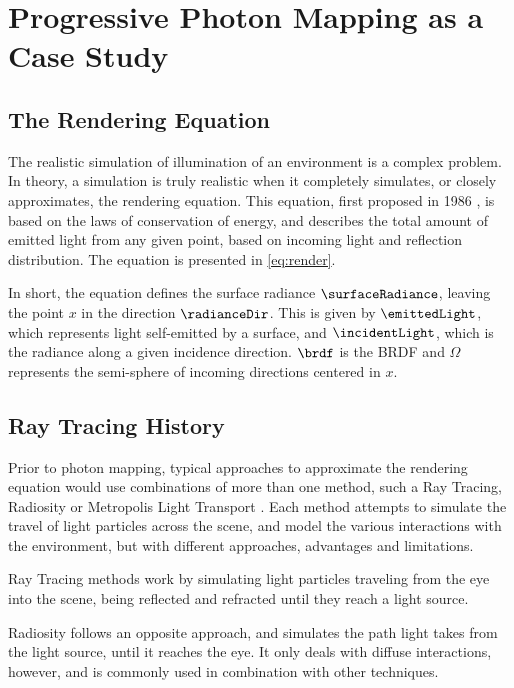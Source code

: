 \documentclass[main.tex]{subfiles}
\begin{document}
\section{Progressive Photon Mapping as a Case Study} \label{section:photon}



\subsection{The Rendering Equation}

The realistic simulation of illumination of an environment is a complex problem. In theory, a simulation is truly realistic when it completely simulates, or closely approximates, the rendering equation. This equation, first proposed in 1986 \cite{kajiya1986rendering}, is based on the laws of conservation of energy, and describes the total amount of emitted light from any given point, based on incoming light and reflection distribution. The equation is presented in \cref{eq:render}.


In short, the equation defines the surface radiance $\surfaceRadiance$, leaving the point $x$ in the direction $\radianceDir$. This is given by $\emittedLight$, which represents light self-emitted by a surface, and $\incidentLight$, which is the radiance along a given incidence direction. $\brdf$ is the \acf{BRDF} and $\Omega$ represents the semi-sphere of incoming directions centered in $x$.


\subsection{Ray Tracing History}

Prior to photon mapping, typical approaches to approximate the rendering equation would use combinations of more than one method, such a Ray Tracing, Radiosity or Metropolis Light Transport \cite{wallace1987two,veach1997metropolis}. Each method attempts to simulate the travel of light particles across the scene, and model the various interactions with the environment, but with different approaches, advantages and limitations.

Ray Tracing methods work by simulating light particles traveling from the eye into the scene, being reflected and refracted until they reach a light source.

Radiosity follows an opposite approach, and simulates the path light takes from the light source, until it reaches the eye. It only deals with diffuse interactions, however, and is commonly used in combination with other techniques.
\end{document}
